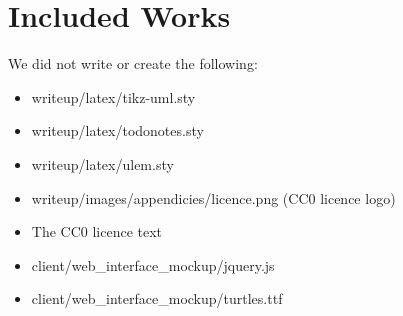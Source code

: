 \section{Included Works}
We did not write or create the following:
\begin{itemize}
\item writeup/latex/tikz-uml.sty
\item writeup/latex/todonotes.sty
\item writeup/latex/ulem.sty
\item writeup/images/appendicies/licence.png (CC0 licence logo)
\item The CC0 licence text
\item client/web\_interface\_mockup/jquery.js 
\item client/web\_interface\_mockup/turtles.ttf 
\end{itemize}

